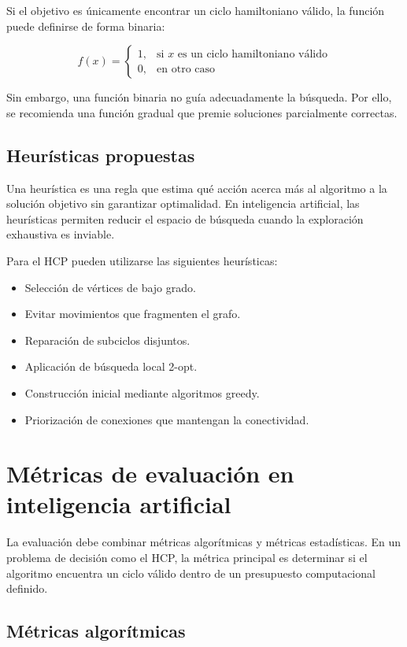 \documentclass[12pt]{article}
\begin{document}
Si el objetivo es únicamente encontrar un ciclo hamiltoniano válido, la función puede definirse de forma binaria:

\[
f(x)=
\begin{cases}
1, & \text{si } x \text{ es un ciclo hamiltoniano válido} \\
0, & \text{en otro caso}
\end{cases}
\]

Sin embargo, una función binaria no guía adecuadamente la búsqueda. Por ello, se recomienda una función gradual que premie soluciones parcialmente correctas.

\subsection{Heurísticas propuestas}

Una heurística es una regla que estima qué acción acerca más al algoritmo a la solución objetivo sin garantizar optimalidad. En inteligencia artificial, las heurísticas permiten reducir el espacio de búsqueda cuando la exploración exhaustiva es inviable. \cite{russell}

Para el HCP pueden utilizarse las siguientes heurísticas:

\begin{itemize}
    \item Selección de vértices de bajo grado.
    \item Evitar movimientos que fragmenten el grafo.
    \item Reparación de subciclos disjuntos.
    \item Aplicación de búsqueda local 2-opt.
    \item Construcción inicial mediante algoritmos greedy.
    \item Priorización de conexiones que mantengan la conectividad.
\end{itemize}

\section{Métricas de evaluación en inteligencia artificial}

La evaluación debe combinar métricas algorítmicas y métricas estadísticas. En un problema de decisión como el HCP, la métrica principal es determinar si el algoritmo encuentra un ciclo válido dentro de un presupuesto computacional definido.

\subsection{Métricas algorítmicas}
\end{document}
